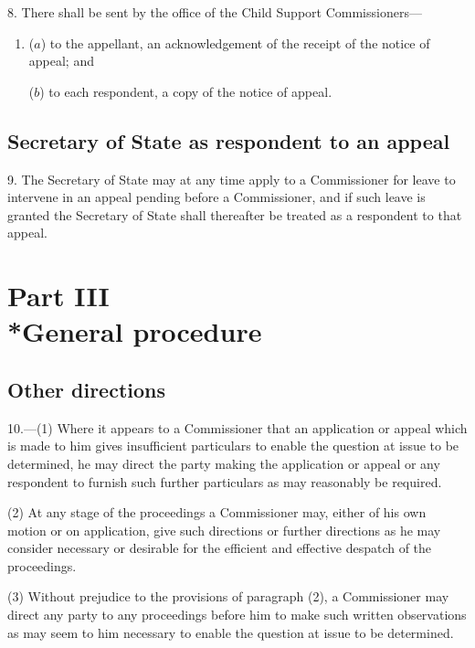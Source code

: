 \documentclass[a4paper]{article}
\newcommand{\parthead}{}
\begin{document}
8.  There shall be sent by the office of the Child Support Commissioners—
\begin{enumerate}\item[]
($a$) to the appellant, an acknowledgement of the receipt of the notice of appeal; and

($b$) to each respondent, a copy of the notice of appeal.
\end{enumerate}

\subsection[9. Secretary of State as respondent to an appeal]{Secretary of State as respondent to an appeal}

9.  The Secretary of State may at any time apply to a Commissioner for leave to intervene in an appeal pending before a Commissioner, and if such leave is granted the Secretary of State shall thereafter be treated as a respondent to that appeal.

\section[Part III --- General procedure]{Part III\\*General procedure}

\renewcommand\parthead{--- Part III}

\subsection[10. Other directions]{Other directions}

10.—(1) Where it appears to a Commissioner that an application or appeal which is made to him gives insufficient particulars to enable the question at issue to be determined, he may direct the party making the application or appeal or any respondent to furnish such further particulars as may reasonably be required.

(2) At any stage of the proceedings a Commissioner may, either of his own motion or on application, give such directions or further directions as he may consider necessary or desirable for the efficient and effective despatch of the proceedings.

(3) Without prejudice to the provisions of paragraph (2), a Commissioner may direct any party to any proceedings before him to make such written observations as may seem to him necessary to enable the question at issue to be determined.
\end{document}
